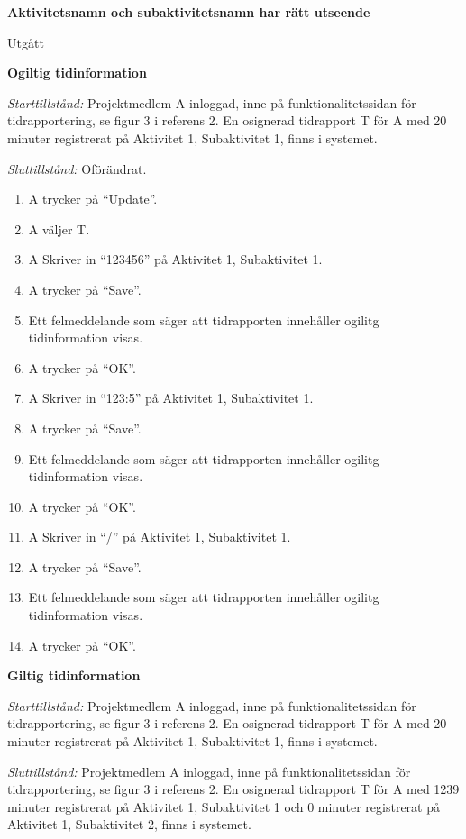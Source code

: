 \documentclass[a4paper]{article}
\begin{document}
\begin{FT}

\item\textbf{Aktivitetsnamn och subaktivitetsnamn har rätt utseende}

Utgått

\item\textbf{Ogiltig tidinformation}

\emph{Starttillstånd:} Projektmedlem A inloggad, inne på funktionalitetssidan för tidrapportering, se figur 3 i referens 2. En osignerad tidrapport T för A med 20 minuter registrerat på Aktivitet 1, Subaktivitet 1, finns i systemet.

\emph{Sluttillstånd:} Oförändrat.

\begin{enumerate}
\item A trycker på ``Update''.
\item A väljer T.
\item A Skriver in ``123456'' på Aktivitet 1, Subaktivitet 1.
\item A trycker på ``Save''.
\item Ett felmeddelande som säger att tidrapporten innehåller ogilitg tidinformation visas.
\item A trycker på ``OK''.
\item A Skriver in ``123:5'' på Aktivitet 1, Subaktivitet 1.
\item A trycker på ``Save''.
\item Ett felmeddelande som säger att tidrapporten innehåller ogilitg tidinformation visas.
\item A trycker på ``OK''.
\item A Skriver in ``/'' på Aktivitet 1, Subaktivitet 1.
\item A trycker på ``Save''.
\item Ett felmeddelande som säger att tidrapporten innehåller ogilitg tidinformation visas.
\item A trycker på ``OK''.
\end{enumerate}


\item\textbf{Giltig tidinformation}

\emph{Starttillstånd:} Projektmedlem A inloggad, inne på funktionalitetssidan för tidrapportering, se figur 3 i referens 2. En osignerad tidrapport T för A med 20 minuter registrerat på Aktivitet 1, Subaktivitet 1, finns i systemet.

\emph{Sluttillstånd:} Projektmedlem A inloggad, inne på funktionalitetssidan för tidrapportering, se figur 3 i referens 2. En osignerad tidrapport T för A med 1239 minuter registrerat på Aktivitet 1, Subaktivitet 1 och 0 minuter registrerat på Aktivitet 1, Subaktivitet 2, finns i systemet.


\end{FT}
\end{document}
